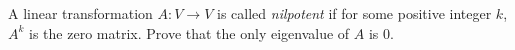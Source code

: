 \begin{exercise}
  \label{ex:hw06:nilpotent-eigenvalues}
  A linear transformation \(A:V\to V\) is called \emph{nilpotent} if for some
  positive integer \(k\), \(A^k\) is the zero matrix. Prove that the only
  eigenvalue of \(A\) is \(0\).
\end{exercise}

